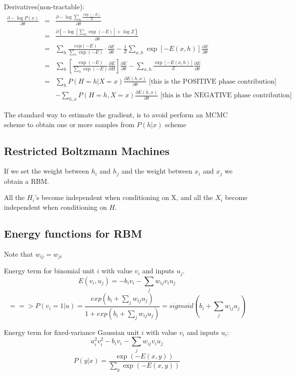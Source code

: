 Derivatives(non-tractable):
\begin{eqnarray*}
    \frac{\partial -\log P(x)}{\partial \theta} &=&
    \frac{\partial -\log \sum_h \frac{\exp (-E)}{Z}}{\partial \theta} \\
    &=&\frac{\partial \left\{ -\log[\sum_h\exp (-E)]+\log Z
    \right\}}{\partial \theta} \\
    &=& \sum_h \frac{exp(-E)}{\sum_h \exp(-E)} \cdot
    \frac{\partial E}{\partial \theta} - \frac{1}{Z}\sum_{x,h} \exp\left[
    -E(x,h) \right]\frac{\partial E}{\partial \theta} \\
    &=&\sum_h \left[ \frac{\exp(-E)}{\sum_h
    \exp(-E)}\frac{\partial E}{\partial H}\right] \frac{\partial
    E}{\partial \theta} - \sum_{x,h} \frac{\exp[-E(x,h)]}{Z}\frac{\partial
    E}{\partial \theta} \\
 &=& \sum_h P(H=h|X=x)
    \frac{\partial E(h,x)}{\partial \theta} \mbox{ [this is the POSITIVE
    phase contribution] }\\  & &- \sum_{h,x}  P(H=h,X=x) \frac{\partial
    E(h,x)}{\partial \theta} \mbox{ [this is the NEGATIVE phase
    contribution] } 
\end{eqnarray*}

The standard way to estimate the gradient, is to avoid perform an MCMC
scheme to obtain one or more samples from $P(h|x)$
scheme
\subsection{Restricted Boltzmann Machines}
If we set the weight between $h_i$ and $h_j$ and the weight between $x_i$
and $x_j$ we obtain a RBM.

All the $H_i$'s become independent when conditioning on X, and all the
$X_i$ become independent when conditioning on $H$.

\subsection{Energy functions for RBM}
Note that $w_{ij} = w_{ji}$

Energy term for binomial unit $i$ with value $v_i$ and inputs
    $u_j$.
    \[
        E(v_i, u_j) = -b_i v_i - \sum_j w_{ij} v_i u_j 
    \]
    \[ ==> P(v_i=1 | u) = \frac{exp(b_i + \sum_j w_{ij} u_j) }{ 1 +
    exp(b_i + \sum_j w_{ij} u_j) } = sigmoid\left(b_i + \sum_j w_{ij}
    u_j\right) \]

Energy term for fixed-variance Gaussian unit $i$ with value
    $v_i$ and inputs $u_i$:
    \[ a_i^2 v_i^2 - b_i v_i - \sum_j w_{ij} v_i u_j\]
    \[ P(y|x) = \frac{\exp(-E(x,y)) }{ \sum_y \exp(-E(x,y)) } \]

